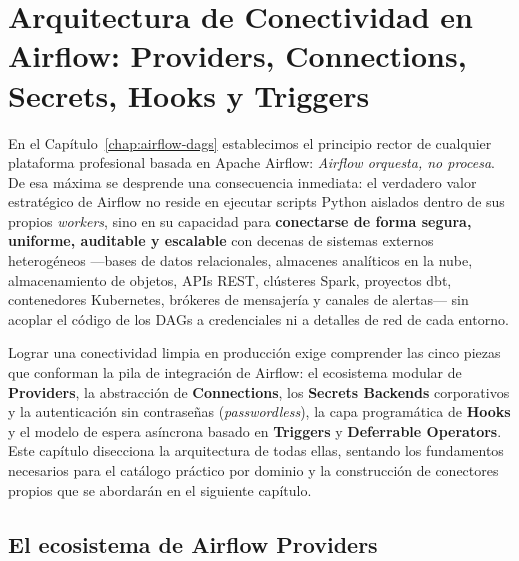 
\chapter{Arquitectura de Conectividad en Airflow: Providers, Connections, Secrets, Hooks y Triggers}\label{chap:airflow-conectividad}

En el Capítulo~\ref{chap:airflow-dags} establecimos el principio rector de cualquier plataforma profesional basada en Apache Airflow: \textit{Airflow orquesta, no procesa}. De esa máxima se desprende una consecuencia inmediata: el verdadero valor estratégico de Airflow no reside en ejecutar scripts Python aislados dentro de sus propios \textit{workers}, sino en su capacidad para \textbf{conectarse de forma segura, uniforme, auditable y escalable} con decenas de sistemas externos heterogéneos ---bases de datos relacionales, almacenes analíticos en la nube, almacenamiento de objetos, APIs REST, clústeres Spark, proyectos dbt, contenedores Kubernetes, brókeres de mensajería y canales de alertas--- sin acoplar el código de los DAGs a credenciales ni a detalles de red de cada entorno.

Lograr una conectividad limpia en producción exige comprender las cinco piezas que conforman la pila de integración de Airflow: el ecosistema modular de \textbf{Providers}, la abstracción de \textbf{Connections}, los \textbf{Secrets Backends} corporativos y la autenticación sin contraseñas (\textit{passwordless}), la capa programática de \textbf{Hooks} y el modelo de espera asíncrona basado en \textbf{Triggers} y \textbf{Deferrable Operators}. Este capítulo disecciona la arquitectura de todas ellas, sentando los fundamentos necesarios para el catálogo práctico por dominio y la construcción de conectores propios que se abordarán en el siguiente capítulo.

\section{El ecosistema de Airflow Providers}\label{sec:ecosistema-providers}

